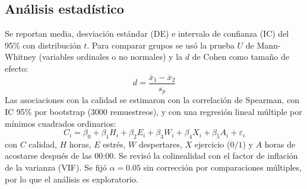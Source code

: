 \documentclass[conference]{IEEEtran}
\begin{document}
\subsection{Análisis estadístico}
Se reportan media, desviación estándar (DE) e intervalo de confianza (IC) del 95\% con distribución $t$. Para comparar grupos se usó la prueba $U$ de Mann-Whitney (variables ordinales o no normales) y la $d$ de Cohen como tamaño de efecto:
\begin{equation}
d = \frac{\overline{x}_1 - \overline{x}_2}{s_p}
\end{equation}
Las asociaciones con la calidad se estimaron con la correlación de Spearman, con IC 95\% por bootstrap (3000 remuestreos), y con una regresión lineal múltiple por mínimos cuadrados ordinarios:
\begin{equation}
C_i = \beta_0 + \beta_1 H_i + \beta_2 E_i + \beta_3 W_i + \beta_4 X_i + \beta_5 A_i + \varepsilon_i
\end{equation}
con $C$ calidad, $H$ horas, $E$ estrés, $W$ despertares, $X$ ejercicio ($0/1$) y $A$ horas de acostarse después de las 00:00. Se revisó la colinealidad con el factor de inflación de la varianza (VIF). Se fijó $\alpha=0.05$ sin corrección por comparaciones múltiples, por lo que el análisis es exploratorio.
\end{document}
